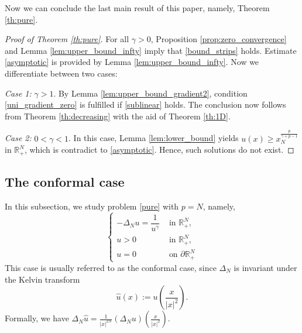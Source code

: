 \documentclass[reqno]{amsart}
\theoremstyle{plain}
\theoremstyle{definition}
\theoremstyle{remark}
\begin{document}
	Now we can conclude the last main result of this paper, namely, Theorem \ref{th:pure}.
	\begin{proof}[Proof of Theorem \ref{th:pure}]
		For all $\gamma>0$,	Proposition \ref{prop:zero_convergence} and Lemma \ref{lem:upper_bound_infty} imply that \eqref{bound_strips} holds. Estimate \eqref{asymptotic} is provided by Lemma \ref{lem:upper_bound_infty}. Now we differentiate between two cases:
		
		\textit{Case 1:} $\gamma>1$. By Lemma \ref{lem:upper_bound_gradient2}, condition \eqref{uni_gradient_zero} is fulfilled if \eqref{sublinear} holds.		
		The conclusion now follows from Theorem \ref{th:decreasing} with the aid of Theorem \ref{th:1D}.
		
		\textit{Case 2:} $0<\gamma<1$. In this case, Lemma \ref{lem:lower_bound} yields $u(x) \ge x_N^\frac{p}{\gamma+p-1}$ in $\mathbb{R}^N_+$, which is contradict to \eqref{asymptotic}. Hence, such solutions do not exist.
	\end{proof}
	
	\subsection{The conformal case} In this subsection, we study problem \eqref{pure} with $p=N$, namely,
	\begin{equation}\label{conformal}	
		\begin{cases}
			-\Delta_N u = \dfrac{1}{u^\gamma} & \text{ in } \mathbb{R}^N_+,\\
			u>0 & \text{ in } \mathbb{R}^N_+,\\
			u=0 & \text{ on } \partial\mathbb{R}^N_+
		\end{cases}
	\end{equation}
	This case is usually referred to as the conformal case, since $\Delta_N$ is invariant under the Kelvin transform
	\[
	\hat u(x) := u\left(\frac{x}{|x|^2}\right).
	\]
	Formally, we have $\Delta_N \hat u = \frac{1}{|x|^{2N}} (\Delta_N u) \left(\frac{x}{|x|^2}\right)$.
	
\end{document}
